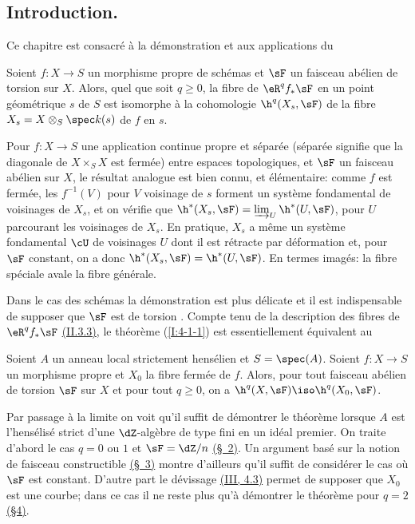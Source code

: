 \subsection{Introduction.}\label{I:4-1}

Ce chapitre est consacré à la démonstration et aux applications du 





\begin{theoremdotdash}\label{I:4-1-1}
Soient $f:X\to S$ un morphisme propre de schémas et $\sF$ un faisceau abélien 
de torsion sur $X$. Alors, quel que soit $q\geqslant 0$, la fibre de 
$\eR^q f_* \sF$ en un point géométrique $s$ de $S$ est isomorphe à la 
cohomologie $\h^q(X_s,\sF)$ de la fibre $X_s=X\otimes_S \spec k(s)$ de $f$ en 
$s$. 
\end{theoremdotdash}

Pour $f:X\to S$ une application continue propre et séparée (séparée 
signifie que la diagonale de $X\times_S X$ est fermée) entre espaces 
topologiques, et $\sF$ un faisceau abélien sur $X$, le résultat analogue est 
bien connu, et élémentaire: comme $f$ est fermée, les $f^{-1}(V)$ pour 
$V$ voisinage de $s$ forment un système fondamental de voisinages de $X_s$, et 
on vérifie que $\h^*(X_s,\sF) = \varinjlim_U \h^*(U,\sF)$, pour $U$ parcourant les 
voisinages de $X_s$. En pratique, $X_s$ a même un système fondamental 
$\cU$ de voisinages $U$ dont il est rétracte par déformation et, pour $\sF$ 
constant, on a donc $\h^*(X_s,\sF)=\h^*(U,\sF)$. En termes imagés: la fibre 
spéciale avale la fibre générale. 

Dans le cas des schémas la démonstration est plus délicate et il est 
indispensable de supposer que $\sF$ est de torsion . Compte 
tenu de la description des fibres de $\eR^q f_* \sF$ \hyperref[I:2-3-3]{(II.3.3)}, le théorème 
(\ref{I:4-1-1}) est essentiellement équivalent au 

 
  
   
    
\begin{theoremdotdash}\label{I:4-1-2}
Soient $A$ un anneau local strictement hensélien et $S=\spec(A)$. Soient 
$f:X\to S$ un morphisme propre et $X_0$ la fibre fermée de $f$. Alors, pour 
tout faisceau abélien de torsion $\sF$ sur $X$ et pour tout $q\geqslant 0$, on 
a $\h^q(X,\sF) \iso \h^q(X_0,\sF)$. 
\end{theoremdotdash} 

Par passage à la limite on voit qu'il suffit de démontrer le théorème 
lorsque $A$ est l'hensélisé strict d'une $\dZ$-algèbre  de type fini en 
un idéal premier. On traite d'abord le cas $q=0$ ou $1$ et $\sF=\dZ/n$ 
\hyperref[I:4-2]{(\S~2)}. Un argument basé sur la notion de faisceau constructible 
\hyperref[I:4-3]{(\S~3)} montre d'ailleurs qu'il suffit de considérer le cas où $\sF$ est 
constant. D'autre part le dévissage \hyperref[I:3-4-3]{(III, 4.3)} permet de supposer que 
$X_0$ est une courbe; dans ce cas il ne reste plus qu'à démontrer le 
théorème pour $q=2$ \hyperref[I:4-4]{(\S4)}. 

